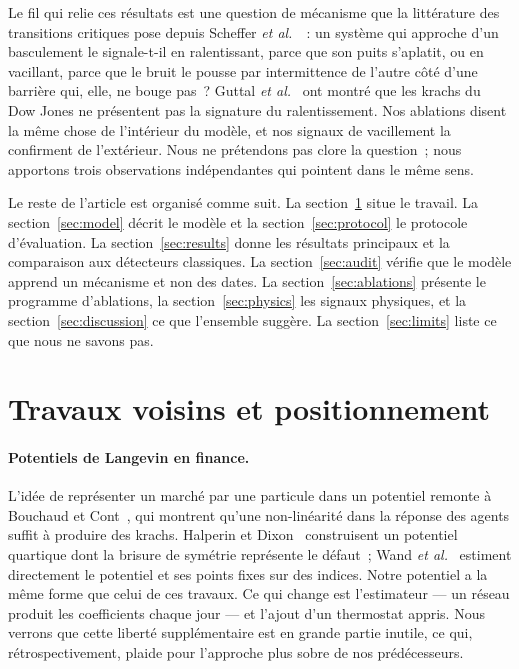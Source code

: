 \documentclass[11pt,a4paper]{article}
\begin{document}
Le fil qui relie ces résultats est une question de mécanisme que la littérature des transitions critiques pose depuis Scheffer \emph{et al.}~\cite{scheffer2009}~: un système qui approche d'un basculement le signale-t-il en ralentissant, parce que son puits s'aplatit, ou en vacillant, parce que le bruit le pousse par intermittence de l'autre côté d'une barrière qui, elle, ne bouge pas~? Guttal \emph{et al.}~\cite{guttal2016} ont montré que les krachs du Dow Jones ne présentent pas la signature du ralentissement. Nos ablations disent la même chose de l'intérieur du modèle, et nos signaux de vacillement la confirment de l'extérieur. Nous ne prétendons pas clore la question~; nous apportons trois observations indépendantes qui pointent dans le même sens.

Le reste de l'article est organisé comme suit. La section~\ref{sec:related} situe le travail. La section~\ref{sec:model} décrit le modèle et la section~\ref{sec:protocol} le protocole d'évaluation. La section~\ref{sec:results} donne les résultats principaux et la comparaison aux détecteurs classiques. La section~\ref{sec:audit} vérifie que le modèle apprend un mécanisme et non des dates. La section~\ref{sec:ablations} présente le programme d'ablations, la section~\ref{sec:physics} les signaux physiques, et la section~\ref{sec:discussion} ce que l'ensemble suggère. La section~\ref{sec:limits} liste ce que nous ne savons pas.

\section{Travaux voisins et positionnement}
\label{sec:related}

\paragraph{Potentiels de Langevin en finance.} L'idée de représenter un marché par une particule dans un potentiel remonte à Bouchaud et Cont~\cite{bouchaud1998}, qui montrent qu'une non-linéarité dans la réponse des agents suffit à produire des krachs. Halperin et Dixon~\cite{halperin2019} construisent un potentiel quartique dont la brisure de symétrie représente le défaut~; Wand \emph{et al.}~\cite{wand2024} estiment directement le potentiel et ses points fixes sur des indices. Notre potentiel a la même forme que celui de ces travaux. Ce qui change est l'estimateur --- un réseau produit les coefficients chaque jour --- et l'ajout d'un thermostat appris. Nous verrons que cette liberté supplémentaire est en grande partie inutile, ce qui, rétrospectivement, plaide pour l'approche plus sobre de nos prédécesseurs.
\end{document}
